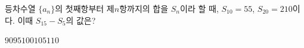 등차수열 $\{a_n\}$의 첫째항부터 제$n$항까지의 합을 $S_n$이라 할 때, $S_{10}=55$, $S_{20}=210$이다. 이때 $S_{15}-S_5$의 값은?
\begin{choices32}{$90$}{$95$}{$100$}{$105$}{$110$}\end{choices32}
